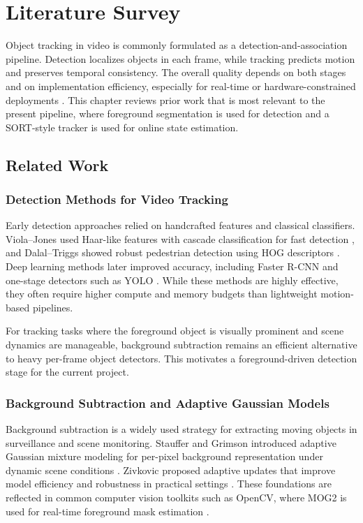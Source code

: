 \chapter{Literature Survey}
\label{section:lit_survey}

Object tracking in video is commonly formulated as a detection-and-association pipeline. Detection 
localizes objects in each frame, while tracking predicts motion and preserves temporal consistency. 
The overall quality depends on both stages and on implementation efficiency, especially for real-time 
or hardware-constrained deployments \cite{Milan2016MOT16, Bewley2016_sort}. This chapter reviews prior 
work that is most relevant to the present pipeline, where foreground segmentation is used for detection 
and a SORT-style tracker is used for online state estimation.

\section{Related Work}
\label{section:related_work}

\subsection{Detection Methods for Video Tracking}
Early detection approaches relied on handcrafted features and classical classifiers. Viola--Jones used 
Haar-like features with cascade classification for fast detection \cite{ViolaJones2001}, and Dalal--Triggs 
showed robust pedestrian detection using HOG descriptors \cite{DalalTriggs2005}. Deep learning methods 
later improved accuracy, including Faster R-CNN \cite{Ren2015FasterRCNN} and one-stage detectors such as 
YOLO \cite{Redmon2016YOLO}. While these methods are highly effective, they often require higher compute 
and memory budgets than lightweight motion-based pipelines.

For tracking tasks where the foreground object is visually prominent and scene dynamics are manageable, 
background subtraction remains an efficient alternative to heavy per-frame object detectors. This motivates 
a foreground-driven detection stage for the current project.

\subsection{Background Subtraction and Adaptive Gaussian Models}
Background subtraction is a widely used strategy for extracting moving objects in surveillance and 
scene monitoring. Stauffer and Grimson introduced adaptive Gaussian mixture modeling for per-pixel 
background representation under dynamic scene conditions \cite{StaufferGrimson1999}. Zivkovic proposed 
adaptive updates that improve model efficiency and robustness in practical 
settings \cite{Zivkovic2004, ZivkovicHeijden2006}. These foundations are reflected in common computer 
vision toolkits such as OpenCV, where MOG2 is used for real-time foreground mask 
estimation \cite{Bradski2000OpenCV}.


